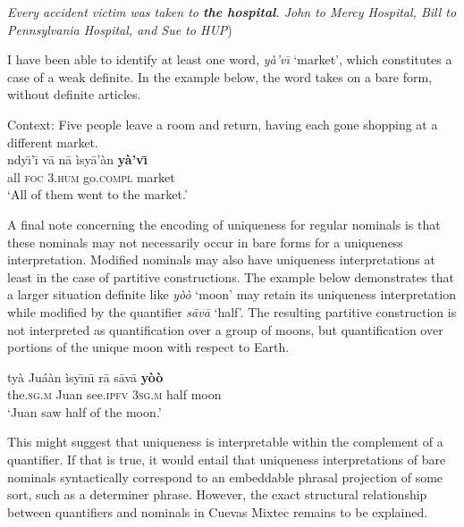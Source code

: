 \documentclass[output=paper,modfonts,nonflat]{langsci/langscibook}
\begin{document}
\ea {}\label{ex:cisneros:63}
\textit{Every accident victim was taken to \textbf{the hospital}. {\op}John to Mercy Hospital, Bill to Pennsylvania Hospital, and Sue to HUP}) \citep[3]{Schwarz2014}
\z 

I have been able to identify at least one word, \textit{y\`a'v\=\i} `market', which constitutes a case of a weak definite.  In the example below, the word takes on a bare form, without definite articles.

\ea {}\label{ex:cisneros:64}
Context: Five people leave a room and return, having each gone shopping at a different market. \\
\gll
{\llap{\checkmark~}}{\ob}ndy\=\i'\=\i{} v\=a n\=a{\cb} \`isy\=a'\`an \textbf{y\`a'v\=\i}\\
{\db}all \textsc{foc} 3.\textsc{hum} go.\textsc{compl} market\\
\glt
`All of them went to the market.'
\z

A final note concerning the encoding of uniqueness for regular nominals is that these nominals may not necessarily occur in bare forms for a uniqueness interpretation.  Modified nominals may also have uniqueness interpretations at least in the case of partitive constructions.  The example below demonstrates that a larger situation definite like \textit{y\`o\`o} `moon' may retain its uniqueness interpretation while modified by the quantifier \textit{s\=av\=a} `half'.  The resulting partitive construction is not interpreted as quantification over a group of moons, but quantification over portions of the unique moon with respect to Earth. 

\ea {}\label{ex:cisneros:65}
\gll
{\ob}ty\`a Ju\'a\`an{\cb} \`isy\=\i n\=\i{} r\=a {\ob}s\=av\=a \textbf{y\`o\`o}{\cb}\\
{\db}the.\textsc{sg.m} Juan see.\textsc{ipfv} 3\textsc{sg.m} {\db}half moon\\
\glt
`Juan saw half of the moon.'
\z 

This might suggest that uniqueness is interpretable within the complement of a quantifier.  If that is true, it would entail that uniqueness interpretations of bare nominals syntactically correspond to an embeddable phrasal projection of some sort, such as a determiner phrase.  However, the exact structural relationship between quantifiers and nominals in Cuevas Mixtec remains to be explained.
\end{document}
